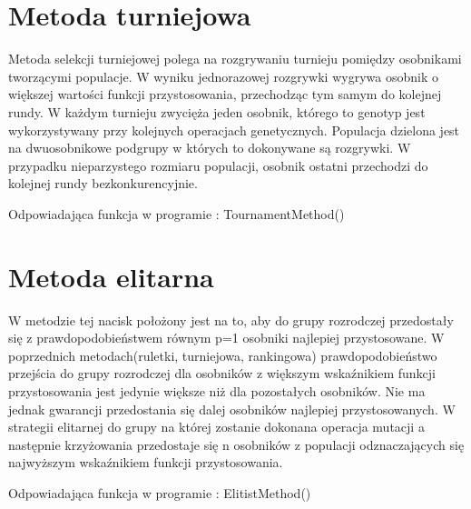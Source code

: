 
\section{Metoda turniejowa}\label{sec:narzedzia}


Metoda selekcji turniejowej polega na rozgrywaniu turnieju pomiędzy osobnikami tworzącymi populacje. W wyniku jednorazowej rozgrywki wygrywa osobnik o większej wartości funkcji przystosowania, przechodząc tym samym do kolejnej rundy. W każdym turnieju zwycięża jeden osobnik, którego to genotyp jest wykorzystywany przy kolejnych operacjach genetycznych. Populacja dzielona jest na dwuosobnikowe podgrupy w których to dokonywane są rozgrywki. W przypadku nieparzystego rozmiaru populacji, osobnik ostatni przechodzi do kolejnej rundy bezkonkurencyjnie. \\
\par
Odpowiadająca funkcja w programie : TournamentMethod()


\section{Metoda elitarna}\label{sec:przygotowanieDokumentu}

W metodzie tej nacisk położony jest na to, aby do grupy rozrodczej przedostały się z prawdopodobieństwem równym p=1 osobniki najlepiej przystosowane. W poprzednich metodach(ruletki, turniejowa, rankingowa) prawdopodobieństwo przejścia do grupy rozrodczej dla osobników z większym wskaźnikiem funkcji przystosowania jest jedynie większe niż dla pozostałych osobników. Nie ma jednak gwarancji przedostania się dalej osobników najlepiej przystosowanych. W strategii elitarnej do grupy na której zostanie dokonana operacja mutacji a następnie krzyżowania przedostaje się n osobników z populacji odznaczających się najwyższym wskaźnikiem funkcji przystosowania.\\
\par
Odpowiadająca funkcja w programie : ElitistMethod()

